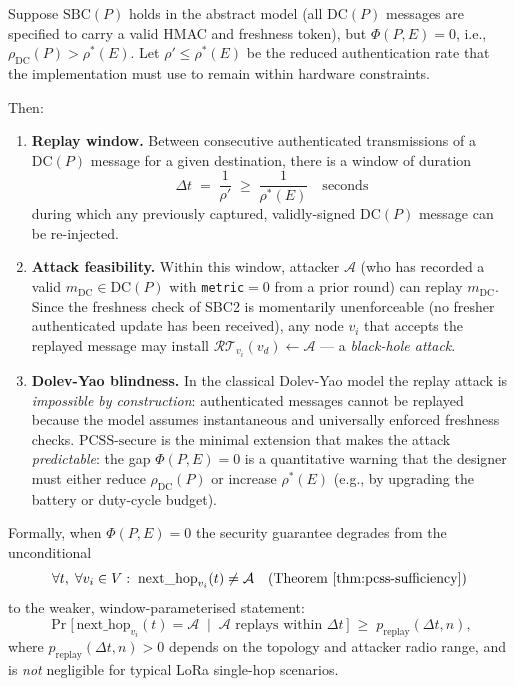 \begin{proposition}[Replay window under $\Phi=0$]
\label{prop:replay-window}
Suppose $\mathrm{SBC}(P)$ holds in the abstract model (all $\mathrm{DC}(P)$
messages are specified to carry a valid HMAC and freshness token), but
$\Phi(P, E) = 0$, i.e., $\rho_{\mathrm{DC}}(P) > \rho^*(E)$.
Let $\rho' \le \rho^*(E)$ be the reduced authentication rate that the
implementation must use to remain within hardware constraints.

Then:
\begin{enumerate}[label=(\roman*)]
  \item \textbf{Replay window.}  Between consecutive authenticated
        transmissions of a $\mathrm{DC}(P)$ message for a given
        destination, there is a window of duration
        \[
          \Delta t \;=\; \frac{1}{\rho'} \;\ge\; \frac{1}{\rho^*(E)}
          \quad\text{seconds}
        \]
        during which any previously captured, validly-signed
        $\mathrm{DC}(P)$ message can be re-injected.

  \item \textbf{Attack feasibility.}  Within this window, attacker
        $\mathcal{A}$ (who has recorded a valid
        $m_{\mathrm{DC}} \in \mathrm{DC}(P)$ with \texttt{metric}$=0$
        from a prior round) can replay $m_{\mathrm{DC}}$.  Since the
        freshness check of SBC2 is momentarily unenforceable (no fresher
        authenticated update has been received), any node $v_i$ that
        accepts the replayed message may install
        $\mathcal{RT}_{v_i}(v_d) \leftarrow \mathcal{A}$ — a
        \emph{black-hole attack}.

  \item \textbf{Dolev-Yao blindness.}  In the classical Dolev-Yao
        model the replay attack is \emph{impossible by construction}:
        authenticated messages cannot be replayed because the model
        assumes instantaneous and universally enforced freshness checks.
        $\mathrm{PCSS\text{-}secure}$ is the minimal extension that
        makes the attack \emph{predictable}: the gap $\Phi(P,E)=0$ is a
        quantitative warning that the designer must either reduce
        $\rho_{\mathrm{DC}}(P)$ or increase $\rho^*(E)$ (e.g., by
        upgrading the battery or duty-cycle budget).
\end{enumerate}

\noindent Formally, when $\Phi(P,E)=0$ the security guarantee degrades
from the unconditional
\[
  \forall t,\; \forall v_i \in V:\;
  \mathrm{next\_hop}_{v_i}(t) \neq \mathcal{A}
  \quad (\text{Theorem~\ref{thm:pcss-sufficiency}})
\]
to the weaker, window-parameterised statement:
\[
  \Pr\!\bigl[\,
    \mathrm{next\_hop}_{v_i}(t) = \mathcal{A}
    \;\mid\;
    \mathcal{A} \text{ replays within } \Delta t
  \,\bigr]
  \;\ge\; p_{\mathrm{replay}}(\Delta t, n),
\]
where $p_{\mathrm{replay}}(\Delta t, n) > 0$ depends on the topology
and attacker radio range, and is \emph{not} negligible for typical
LoRa single-hop scenarios.
\end{proposition}

